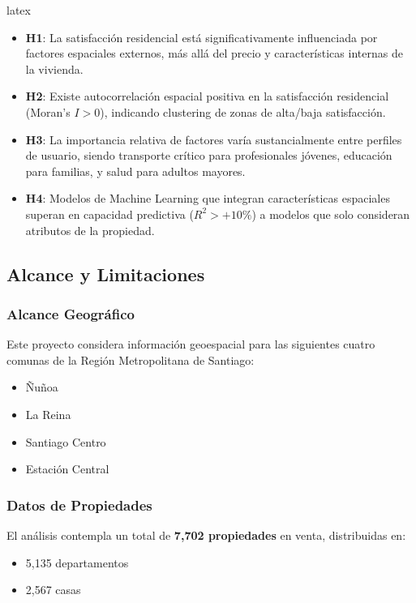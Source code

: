 latex\begin{itemize}
    \item \textbf{H1}: La satisfacción residencial está significativamente influenciada por factores espaciales externos, más allá del precio y características internas de la vivienda.
    
    \item \textbf{H2}: Existe autocorrelación espacial positiva en la satisfacción residencial (Moran's $I > 0$), indicando clustering de zonas de alta/baja satisfacción.
    
    \item \textbf{H3}: La importancia relativa de factores varía sustancialmente entre perfiles de usuario, siendo transporte crítico para profesionales jóvenes, educación para familias, y salud para adultos mayores.
    
    \item \textbf{H4}: Modelos de Machine Learning que integran características espaciales superan en capacidad predictiva ($R^2 > +10\%$) a modelos que solo consideran atributos de la propiedad.
\end{itemize}


\subsection{Alcance y Limitaciones}

\subsubsection{Alcance Geográfico}
Este proyecto considera información geoespacial para las siguientes cuatro comunas de la Región Metropolitana de Santiago:

\begin{itemize}
    \item Ñuñoa
    \item La Reina
    \item Santiago Centro
    \item Estación Central
\end{itemize}

\subsubsection{Datos de Propiedades}
El análisis contempla un total de \textbf{7,702 propiedades} en venta, distribuidas en:
\begin{itemize}
    \item 5,135 departamentos
    \item 2,567 casas
\end{itemize}

